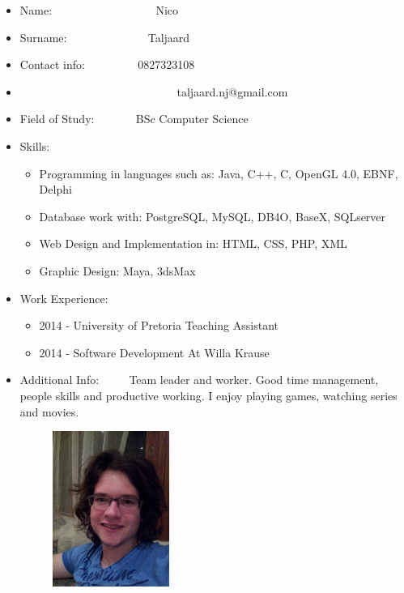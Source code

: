 \documentclass[12pt]{article}
\begin{document}
\begin{itemize}
	\item Name: \ ~~~~~~~~~~~~~~~ \ Nico
	\item Surname: \ ~~~~~~~~~~~ \ Taljaard
	\item Contact info: \ ~~~~~~ \ 0827323108 
	\item \ ~~~~~~~~~~~~~~~~~~~~~~~~~ \ taljaard.nj@gmail.com
	\item Field of Study: \ ~~~~ \ BSc Computer Science
	\item Skills: \begin{itemize}
					\item Programming in languages such as: Java, C++, C, OpenGL 4.0, EBNF, Delphi
					\item Database work with: PostgreSQL, MySQL, DB4O, BaseX, SQLserver
					\item Web Design and Implementation in: HTML, CSS, PHP, XML
					\item Graphic Design: Maya, 3dsMax
				  \end{itemize}
	\item Work Experience: \begin{itemize}
								\item 2014 - University of Pretoria Teaching Assistant
								\item 2014 - Software Development At Willa Krause
							\end{itemize}
	\item Additional Info: \ ~~ \ Team leader and worker. Good time management, people skills and productive working. I enjoy playing games, watching series and movies.
	
\end{itemize}

\newpage
\begin{figure}[ht!]
\centering
\includegraphics[width=2in, height=2in]{./Pictures/MathysEllis.jpg}
\end{figure}
\end{document}
